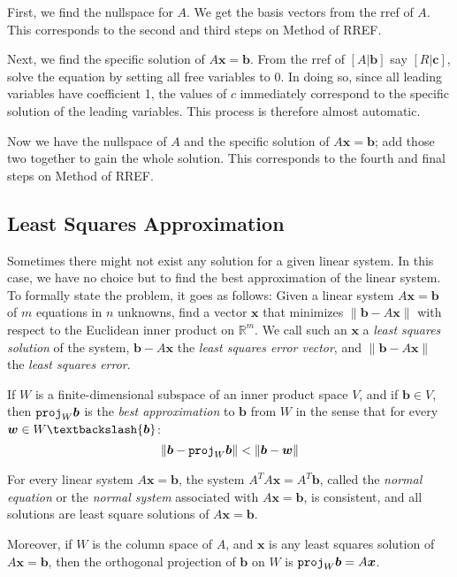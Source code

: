 \documentclass{report}
\begin{document}
			First, we find the nullspace for $A$. We get the basis vectors from the rref of $A$. This corresponds to the second and third steps on Method of RREF.
			
			Next, we find the specific solution of $A\bm{x}=\bm{b}$. From the rref of $\left[A|\bm{b}\right]$ say $\left[R|\bm{c}\right]$, solve the equation by setting all free variables to 0. In doing so, since all leading variables have coefficient 1, the values of $c$ immediately correspond to the specific solution of the leading variables. This process is therefore almost automatic.
			
			Now we have the nullspace of $A$ and the specific solution of $A\bm{x}=\bm{b}$; add those two together to gain the whole solution. This corresponds to the fourth and final steps on Method of RREF.
			
		\subsection{Least Squares Approximation}%
			Sometimes there might not exist any solution for a given linear system. In this case, we have no choice but to find the best approximation of the linear system. To formally state the problem, it goes as follows:
			Given a linear system $A\bm{x}=\bm{b}$ of $m$ equations in $n$ unknowns, find a vector $\bm{x}$ that minimizes $\|\bm{b}-A\bm{x}\|$ with respect to the Euclidean inner product on $\mathbb{R}^m$. We call such an $\bm{x}$ a \emph{least squares solution} of the system, $\bm{b}-A\bm{x}$ the \emph{least squares error vector}, and $\|\bm{b}-A\bm{x}\|$ the \emph{least squares error}.
			\begin{thm}
				If $W$ is a finite-dimensional subspace of an inner product space $V$, and if $\bm{b} \in V$, then $\verb|proj|_W\bm{b}$ is the \emph{best approximation} to $\bm{b}$ from $W$ in the sense that for every $\bm{w} \in W \textbackslash \{\bm{b}\}$:
				\begin{displaymath}
					\|\bm{b}-\verb|proj|_W\bm{b}\| < \|\bm{b}-\bm{w}\|
				\end{displaymath}
			\end{thm}
			
			\begin{thm}
				For every linear system $A\bm{x}=\bm{b}$, the system $A^TA\bm{x}=A^T\bm{b}$, called the \emph{normal equation} or the \emph{normal system} associated with $A\bm{x}=\bm{b}$, is consistent, and all solutions are least square solutions of $A\bm{x}=\bm{b}$.
				
				Moreover, if $W$ is the column space of $A$, and $\bm{x}$ is any least squares solution of $A\bm{x}=\bm{b}$, then the orthogonal projection of $\bm{b}$ on $W$ is $\verb|proj|_W\bm{b}=A\bm{x}$.
			\end{thm}
			
\end{document}
